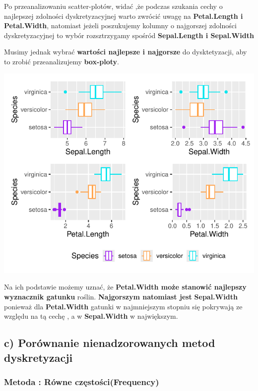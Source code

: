 \documentclass[
  12pt,
]{article}
\begin{document}
Po przeanalizowaniu scatter-plotów, widać ,że podczas szukania cechy o
najlepszej zdolności dyskretyzacyjnej warto zwrócić uwagę na
\textbf{Petal.Length i Petal.Width}, natomiast jeżeli poszukujemy
kolumny o najgorszej zdolności dyskretyzacyjnej to wybór rozsztrzygamy
spośród \textbf{Sepal.Length i Sepal.Width}

Musimy jednak wybrać \textbf{wartości najlepsze i najgorsze} do
dysktetyzacji, aby to zrobić przeanalizujemy \textbf{box-ploty}.

\begin{center}\includegraphics{Sprawozdanie2_files/figure-latex/zad1b2-1} \end{center}

Na ich podstawie możemy uznać, że \textbf{Petal.Width może stanowić
najlepszy wyznacznik gatunku} roślin. \textbf{Najgorszym natomiast jest}
\textbf{Sepal.Width} ponieważ dla \textbf{Petal.Width} gatunki w
najmniejszym stopniu się pokrywają ze względu na tą cechę , a w
\textbf{Sepal.Width} w największym.

\subsection{c) Porównanie nienadzorowanych metod
dyskretyzacji}\label{c-poruxf3wnanie-nienadzorowanych-metod-dyskretyzacji}

\subsubsection{Metoda : Równe
częstości(Frequency)}\label{metoda-ruxf3wne-czux119stoux15bcifrequency}
\end{document}
